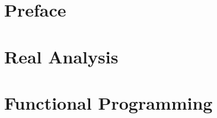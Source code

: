 \documentclass[
  letterpaper,
]{scrreprt}
\renewcommand*\contentsname{Table of contents}
\newcommand\contentsname{Table of contents}
\theoremstyle{remark}
\begin{document}
\newenvironment{nthm}[1]
  {\renewcommand{\thmnm}{#1}\begin{namedthm}}
  {\end{namedthm}}

\newenvironment{ndfn}[1]
  {\renewcommand{\defnm}{#1}\begin{nameddfn}}
  {\end{nameddfn}}

\newenvironment{npf}[1]
  {\begin{proof}[#1]}
  {\end{proof}}


\let\oldgreater\textgreater
\renewcommand{\textgreater}{\null\oldgreater}   %

\ifdefined\Shaded\renewenvironment{Shaded}{\begin{tcolorbox}[sharp corners, boxrule=0pt, breakable, enhanced, interior hidden, frame hidden, borderline west={3pt}{0pt}{shadecolor}]}{\end{tcolorbox}}\fi

\renewcommand*\contentsname{Table of contents}
{
\hypersetup{linkcolor=}
\setcounter{tocdepth}{1}
\tableofcontents
}

\hypertarget{preface}{%
\chapter*{Preface}\label{preface}}




\hypertarget{real-analysis}{%
\chapter{Real Analysis}\label{real-analysis}}


\hypertarget{functional-programming}{%
\chapter{Functional Programming}\label{functional-programming}}
\end{document}
